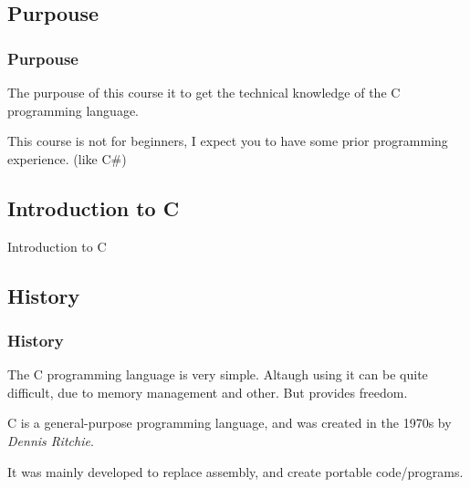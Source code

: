 \documentclass[
	11pt, %
]{beamer}
\begin{document}
\begin{frame}
    \subsection{Purpouse}
	\frametitle{Purpouse}

    The purpouse of this course it to get the technical knowledge of the C programming language.

    \bigskip

    This course is not for beginners, I expect you to have some prior programming experience. (like C#)

\end{frame}



\begin{frame}
    \section{Introduction to C}
	\begin{center}
		{\Huge Introduction to C}
	\end{center}
\end{frame}

\begin{frame}
    \subsection{History}
	\frametitle{History}

    The C programming language is very simple.
    Altaugh using it can be quite difficult, due to memory management and other.
    But provides freedom.

    \bigskip

    C is a general-purpose programming language, and was created in the 1970s by \textit{Dennis Ritchie}. %

    \bigskip

    It was mainly developed to replace assembly, and create portable code/programs.

\end{frame}
\end{document}

